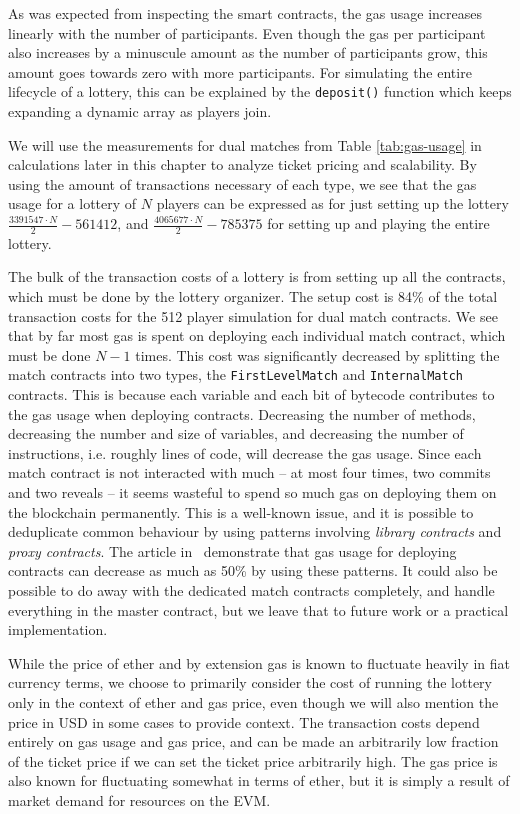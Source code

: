 As was expected from inspecting the smart contracts, the gas usage increases linearly with the number of participants. Even though the gas per participant also increases by a minuscule amount as the number of participants grow, this amount goes towards zero with more participants. For simulating the entire lifecycle of a lottery, this can be explained by the \texttt{deposit()} function which keeps expanding a dynamic array as players join. 

We will use the measurements for dual matches from Table \ref{tab:gas-usage} in calculations later in this chapter to analyze ticket pricing and scalability. By using the amount of transactions necessary of each type, we see that the gas usage for a lottery of $N$ players can be expressed as for just setting up the lottery $\frac{3391547 \cdot N}{2} - 561412$, and $\frac{4065677 \cdot N}{2} - 785375$ for setting up and playing the entire lottery.

The bulk of the transaction costs of a lottery is from setting up all the contracts, which must be done by the lottery organizer. The setup cost is 84\% of the total transaction costs for the 512 player simulation for dual match contracts. We see that by far most gas is spent on deploying each individual match contract, which must be done $N-1$ times. This cost was significantly decreased by splitting the match contracts into two types, the \texttt{FirstLevelMatch} and \texttt{InternalMatch} contracts. This is because each variable and each bit of bytecode contributes to the gas usage when deploying contracts. Decreasing the number of methods, decreasing the number and size of variables, and decreasing the number of instructions, i.e. roughly lines of code, will decrease the gas usage. Since each match contract is not interacted with much – at most four times, two commits and two reveals – it seems wasteful to spend so much gas on deploying them on the blockchain permanently. This is a well-known issue, and it is possible to deduplicate common behaviour by using patterns involving \emph{library contracts} and \emph{proxy contracts}. The article in~\cite{lu_solidity_2018} demonstrate that gas usage for deploying contracts can decrease as much as 50\% by using these patterns. It could also be possible to do away with the dedicated match contracts completely, and handle everything in the master contract, but we leave that to future work or a practical implementation.

While the price of ether and by extension gas is known to fluctuate heavily in fiat currency terms, we choose to primarily consider the cost of running the lottery only in the context of ether and gas price, even though we will also mention the price in USD in some cases to provide context. The transaction costs depend entirely on gas usage and gas price, and can be made an arbitrarily low fraction of the ticket price if we can set the ticket price arbitrarily high. The gas price is also known for fluctuating somewhat in terms of ether, but it is simply a result of market demand for resources on the EVM.
